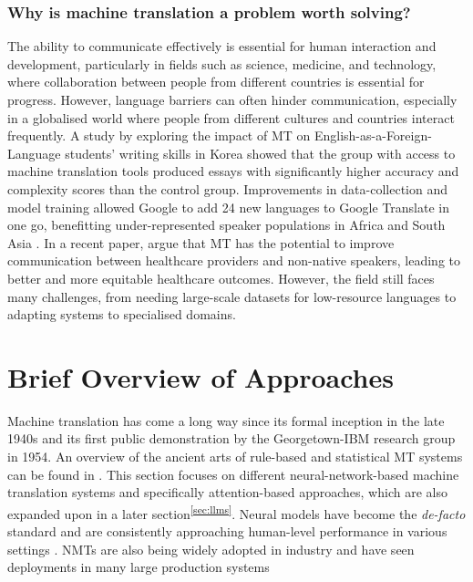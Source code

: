 \documentclass[11pt]{article}
\begin{document}
\subsubsection*{Why is machine translation a problem worth solving?} \vspace{-2mm}
The ability to communicate effectively is essential for human interaction and development, particularly in fields such as science, medicine, and technology, where collaboration between people from different countries is essential for progress.
However, language barriers can often hinder communication, especially in a globalised world where people from different cultures and countries interact frequently. 
A study by \cite{lee2020impact} exploring the impact of MT on English-as-a-Foreign-Language students' writing skills in Korea showed that the group with access to machine translation tools produced essays with significantly higher accuracy and complexity scores than the control group. 
Improvements in data-collection and model training allowed Google to add 24 new languages to Google Translate in one go, benefitting under-represented speaker populations in Africa and South Asia \citep{51503}.
In a recent paper, \cite{khoong2022research} argue that MT has the potential to improve communication between healthcare providers and non-native speakers, leading to better and more equitable healthcare outcomes.
However, the field still faces many challenges, from needing large-scale datasets for low-resource languages to adapting systems to specialised domains.

\section{Brief Overview of Approaches} \vspace{-0.7em}
Machine translation has come a long way since its formal inception in the late 1940s and its first public demonstration by the Georgetown-IBM research group in 1954. An overview of the ancient arts of rule-based and statistical MT systems can be found in \cite{hutchins1997first}. 
This section focuses on different neural-network-based machine translation systems and specifically attention-based approaches, which are also expanded upon in a later section\textsuperscript{\ref{sec:llms}}.
Neural models have become the \textit{de-facto} standard and are consistently approaching human-level performance in various settings \citep{hassan2018achieving}.
NMTs are also being widely adopted in industry and have seen deployments in many large production systems \citep{ schmidt2018move, 51503}
\end{document}
